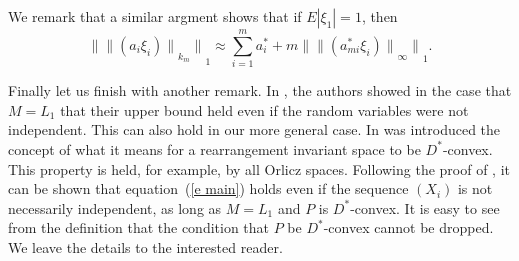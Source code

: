 \documentclass[12pt]{amsart}
\newcommand{\snormo}[1]{{\mathopen\|#1\mathclose\|}}
\begin{document}
We remark that a similar argment shows that
if $E|\xi_1| = 1$, then
\[
   \snormo{\snormo{(a_i \xi_i)}_{k_m}}_1 
   \approx \sum_{i=1}^m a^*_i  + 
    m \snormo{\snormo{(a^*_{m i} \xi_i)}_\infty}_1 .
\]
\bigskip

Finally let us finish with another remark.  In \cite{gordon et al}, the authors
showed in the case that $M = L_1$
that their upper bound held even if the random variables were
not independent.  This can also hold in our more general case.
In \cite{montgomery-smith-semenov} was introduced the concept of what
it means for a rearrangement invariant space to be $D^*$-convex.
This property is held, for example, by all Orlicz spaces.
Following the proof of \cite[Theorem 27]{montgomery-smith-semenov},
it can be shown that equation~(\ref{e main}) holds even if the
sequence $(X_i)$ is not necessarily independent, as long as 
$M = L_1$ and $P$ is $D^*$-convex.  
It is easy to see from the definition that the condition that
$P$ be $D^*$-convex cannot be dropped.
We leave the details to the
interested reader.
\end{document}
